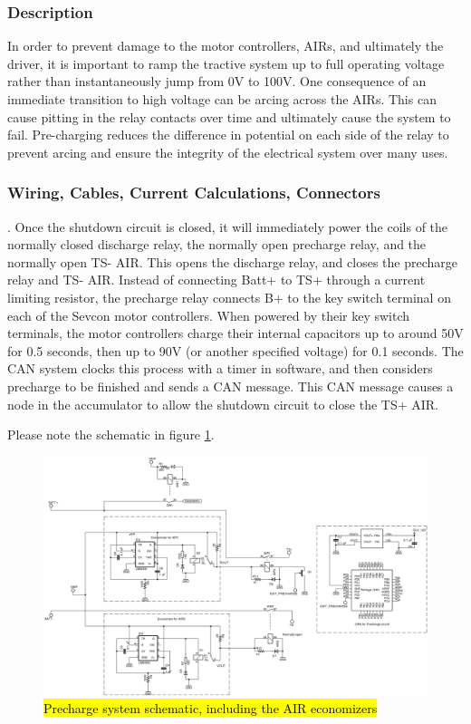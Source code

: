 \documentclass{article}
\DeclareRobustCommand{\hlr}[1]{{\sethlcolor{red}\hl{#1}}}
\begin{document}
        \subsubsection{Description}

            In order to prevent damage to the motor controllers, AIRs, and ultimately the driver, it is important to ramp the tractive system up to full operating voltage rather than instantaneously jump from 0V to 100V. One consequence of an immediate transition to high voltage can be arcing across the AIRs. This can cause pitting in the relay contacts over time and ultimately cause the system to fail. Pre-charging reduces the difference in potential on each side of the relay to prevent arcing and ensure the integrity of the electrical system over many uses.

        \subsubsection{Wiring, Cables, Current Calculations, Connectors}
.
            Once the shutdown circuit is closed, it will immediately power the coils of the normally closed discharge relay, the normally open precharge relay, and the normally open TS- AIR. This opens the discharge relay, and closes the precharge relay and TS- AIR. Instead of connecting Batt+ to TS+ through a current limiting resistor, the precharge relay connects B+ to the key switch terminal on each of the Sevcon motor controllers. When powered by their key switch terminals, the motor controllers charge their internal capacitors up to around 50V for 0.5 seconds, then up to 90V (or another specified voltage) for 0.1 seconds. The CAN system clocks this process with a timer in software, and then considers precharge to be finished and sends a CAN message. This CAN message causes a node in the accumulator to allow the shutdown circuit to close the TS+ AIR.

        Please note the schematic in figure \ref{prechargeschem}.

        \begin{figure}
            \includegraphics[width=\textheight]{precharge}
            \caption{\hlr{Precharge system schematic, including the AIR economizers}}
            \label{prechargeschem}
        \end{figure}
\end{document}
